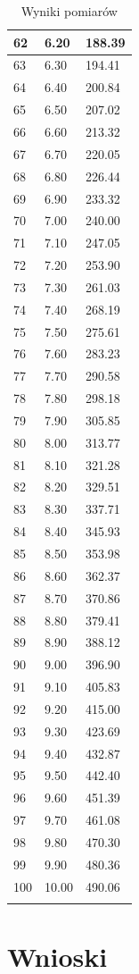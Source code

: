 \documentclass{article}
\begin{document}
\begin{longtable}{|l|l|l|}
        62 & 6.20 & 188.39 \\ \hline
        63 & 6.30 & 194.41 \\ \hline
        64 & 6.40 & 200.84 \\ \hline
        65 & 6.50 & 207.02 \\ \hline
        66 & 6.60 & 213.32 \\ \hline
        67 & 6.70 & 220.05 \\ \hline
        68 & 6.80 & 226.44 \\ \hline
        69 & 6.90 & 233.32 \\ \hline
        70 & 7.00 & 240.00 \\ \hline
        71 & 7.10 & 247.05 \\ \hline
        72 & 7.20 & 253.90 \\ \hline
        73 & 7.30 & 261.03 \\ \hline
        74 & 7.40 & 268.19 \\ \hline
        75 & 7.50 & 275.61 \\ \hline
        76 & 7.60 & 283.23 \\ \hline
        77 & 7.70 & 290.58 \\ \hline
        78 & 7.80 & 298.18 \\ \hline
        79 & 7.90 & 305.85 \\ \hline
        80 & 8.00 & 313.77 \\ \hline
        81 & 8.10 & 321.28 \\ \hline
        82 & 8.20 & 329.51 \\ \hline
        83 & 8.30 & 337.71 \\ \hline
        84 & 8.40 & 345.93 \\ \hline
        85 & 8.50 & 353.98 \\ \hline
        86 & 8.60 & 362.37 \\ \hline
        87 & 8.70 & 370.86 \\ \hline
        88 & 8.80 & 379.41 \\ \hline
        89 & 8.90 & 388.12 \\ \hline
        90 & 9.00 & 396.90 \\ \hline
        91 & 9.10 & 405.83 \\ \hline
        92 & 9.20 & 415.00 \\ \hline
        93 & 9.30 & 423.69 \\ \hline
        94 & 9.40 & 432.87 \\ \hline
        95 & 9.50 & 442.40 \\ \hline
        96 & 9.60 & 451.39 \\ \hline
        97 & 9.70 & 461.08 \\ \hline
        98 & 9.80 & 470.30 \\ \hline
        99 & 9.90 & 480.36 \\ \hline
        100 & 10.00 & 490.06 \\ \hline
\caption{Wyniki pomiarów}
\label{tabelka 1}
\end{longtable}

\section{Wnioski}
\end{document}

